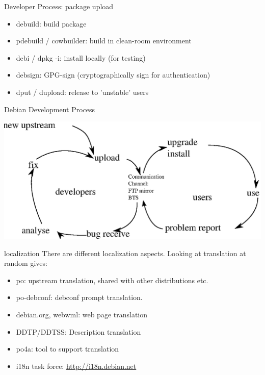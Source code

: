 \documentclass[cjk,dvipdfm,12pt]{beamer}
\begin{document}
\begin{frame}{Developer Process: package upload}
\begin{itemize}
 \item debuild: build package
 \item pdebuild / cowbuilder: build in clean-room environment
 \item debi / dpkg -i: install locally (for testing)
 \item debsign: GPG-sign (cryptographically sign for authentication)
 \item dput / dupload: release to 'unstable' users
\end{itemize}
\end{frame}

\begin{frame}{Debian Development Process}

 \includegraphics[width=1\hsize]{image200805/develcycle.eps} 

\end{frame}

\begin{frame}{localization}
 There are different localization aspects. Looking at translation at
 random gives:
\begin{itemize}
 \item po: upstream translation, shared with other distributions etc.
 \item po-debconf: debconf prompt translation.
 \item debian.org, webwml: web page translation
 \item DDTP/DDTSS: Description translation
 \item po4a: tool to support translation
 \item i18n task force: \url{http://i18n.debian.net}
\end{itemize}
\end{frame}
\end{document}
